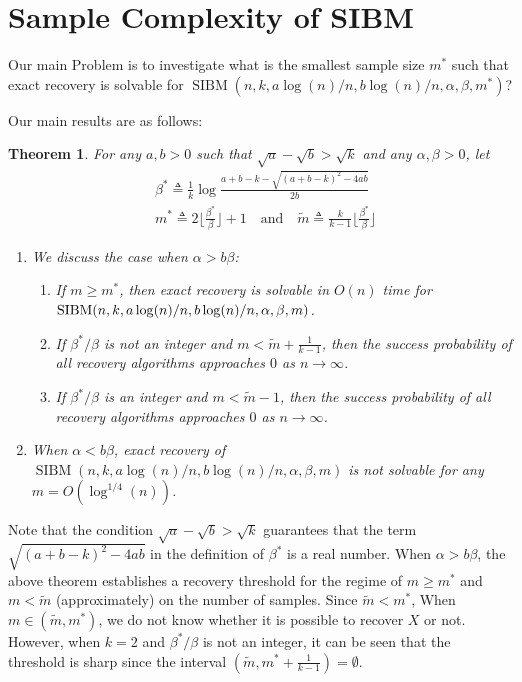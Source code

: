 \label{key}\documentclass[conference]{IEEEtran}
\newtheorem{theorem}{Theorem}%
\DeclareMathOperator{\SIBM}{SIBM}
\begin{document}
\section{Sample Complexity of SIBM}\label{s:trans}
Our main Problem is to investigate what is the smallest sample size $m^\ast$ such that exact recovery is solvable for $\SIBM(n,k, a\log(n)/n, b\log(n)/n,\alpha,\beta,m^\ast)$?

Our main results are as follows:

\begin{theorem} \label{thm:wt1}
For any $a,b> 0$ such that $\sqrt{a}-\sqrt{b}> \sqrt{k}$ and any $\alpha,\beta>0$, let
\begin{align} \label{eq:defstar}
&\beta^\ast \triangleq \frac{1}{k}
\log\frac{a+b-k-\sqrt{(a+b-k)^2-4ab}}{2 b}  \\
&m^\ast \triangleq 2 \Big\lfloor \frac{\beta^\ast}{\beta} \Big\rfloor +1 \text{~~~and~~~}
\tilde{m} \triangleq \frac{k}{k-1}\Big\lfloor \frac{\beta^\ast}{\beta} \Big\rfloor
\end{align}
\begin{enumerate}
	\item We discuss the case when $\alpha > b \beta$:
	\begin{enumerate}
	\item If $m\ge m^\ast$, then exact recovery is solvable in $O(n)$ time for $\SIBM(n,k, a\log(n)/n, \linebreak[4] b\log(n)/n,\alpha,\beta,m)$.
	\item If $\beta^\ast/\beta$ is not an integer and $m < \tilde{m} + \frac{1}{k-1}$, then the success probability of all recovery algorithms approaches $0$ as $n\to\infty$.
	\item If $\beta^\ast/\beta$ is an integer and $m < \tilde{m} -1$, then the success probability of all recovery algorithms approaches $0$ as $n\to\infty$.
	\end{enumerate}
	\item When $\alpha < b \beta$, exact recovery of $\SIBM(n,k, a\log(n)/n, b\log(n)/n,\alpha,\beta,m)$ is not solvable for any $m=O(\log^{1/4}(n))$.
\end{enumerate}

\end{theorem}
Note that the condition $\sqrt{a}-\sqrt{b} > \sqrt{k}$ guarantees that the term $\sqrt{(a+b-k)^2-4ab}$ in the definition of $\beta^\ast$ is a real number.
When $\alpha > b \beta$,
the above theorem establishes a recovery threshold
for the regime of $m \geq m^\ast$ and $m < \tilde{m}$ (approximately) on the number of samples. Since $\tilde{m} < m^*$,
When $m \in (\tilde{m}, m^\ast)$, we do not know whether it is possible to recover $X$ or not.
However, when $k=2$ and $\beta^\ast/\beta$ is not an integer, it can be seen that the threshold is sharp since the interval $(\tilde{m}, m^\ast + \frac{1}{k-1})=\emptyset$.
\end{document}
